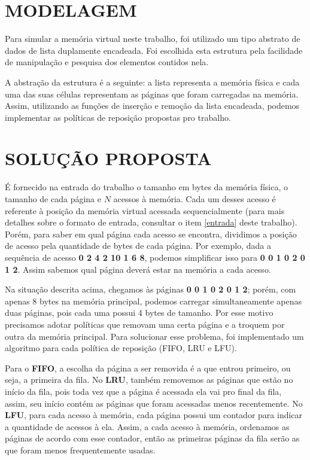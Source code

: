 \documentclass[12pt]{article}
\begin{document}
\section{MODELAGEM}
\label{modelagem}

Para simular a memória virtual neste trabalho, foi utilizado um tipo abstrato de dados de lista duplamente encadeada. Foi escolhida esta estrutura pela facilidade de manipulação e pesquisa dos elementos contidos nela.

A abstração da estrutura é a seguinte: a lista representa a memória física e cada uma das suas células representam as páginas que foram carregadas na memória. Assim, utilizando as funções de inserção e remoção da lista encadeada, podemos implementar as políticas de reposição propostas pro trabalho.

\section{SOLUÇÃO PROPOSTA}
\label{solucao_proposta}

É fornecido na entrada do trabalho o tamanho em bytes da memória física, o tamanho de cada página e $N$ acessos à memória. Cada um desses acesso é referente à posição da memória virtual acessada sequencialmente (para mais detalhes sobre o formato de entrada, consultar o item \ref{entrada} deste trabalho). Porém, para saber em qual página cada acesso se encontra, dividimos a posição de acesso pela quantidade de bytes de cada página. Por exemplo, dada a sequência de acesso \textbf{0 2 4 2 10 1 6 8}, podemos simplificar isso para \textbf{0 0 1 0 2 0 1 2}. Assim sabemos qual página deverá estar na memória a cada acesso.

Na situação descrita acima, chegamos às páginas \textbf{0 0 1 0 2 0 1 2}; porém, com apenas 8 bytes na memória principal, podemos carregar simultaneamente apenas duas páginas, pois cada uma possui 4 bytes de tamanho. Por esse motivo precisamos adotar políticas que removam uma certa página e a troquem por outra da memória principal. Para solucionar esse problema, foi implementado um algoritmo para cada política de reposição (FIFO, LRU e LFU).

Para o \textbf{FIFO}, a escolha da página a ser removida é a que entrou primeiro, ou seja, a primeira da fila. No \textbf{LRU}, também removemos as páginas que estão no início da fila, pois toda vez que a página é acessada ela vai pro final da fila, assim, seu início contém as páginas que foram acessadas menos recentemente. No \textbf{LFU}, para cada acesso à memória, cada página possui um contador para indicar a quantidade de acessos à ela. Assim, a cada acesso à memória, ordenamos as páginas de acordo com esse contador, então as primeiras páginas da fila serão as que foram menos frequentemente usadas.
\end{document}
